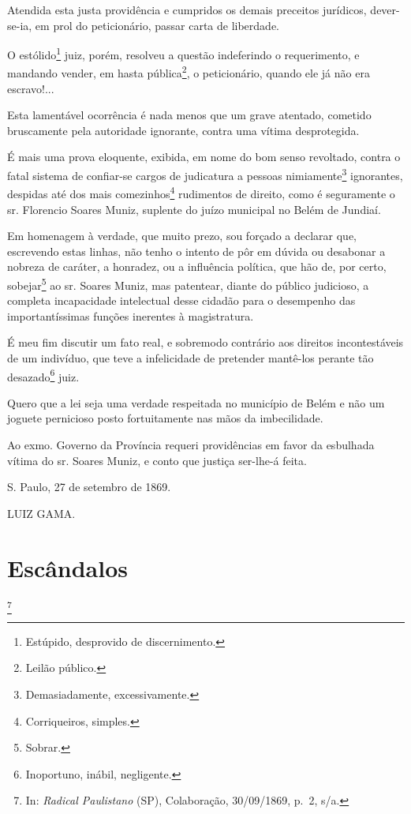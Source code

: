 Atendida esta justa providência e cumpridos os demais preceitos
jurídicos, dever-se-ia, em prol do peticionário, passar carta de
liberdade.

O estólido\footnote{Estúpido, desprovido de discernimento.} juiz,
porém, resolveu a questão indeferindo o requerimento, e mandando vender,
em hasta pública\footnote{Leilão público.}, o peticionário, quando ele
já não era escravo!...

Esta lamentável ocorrência é nada menos que um grave atentado, cometido
bruscamente pela autoridade ignorante, contra uma vítima desprotegida.

É mais uma prova eloquente, exibida, em nome do bom senso revoltado,
contra o fatal sistema de confiar-se cargos de judicatura a pessoas
nimiamente\footnote{Demasiadamente, excessivamente.} ignorantes,
despidas até dos mais comezinhos\footnote{Corriqueiros, simples.}
rudimentos de direito, como é seguramente o sr. Florencio Soares Muniz,
suplente do juízo municipal no Belém de Jundiaí.

Em homenagem à verdade, que muito prezo, sou forçado a declarar que,
escrevendo estas linhas, não tenho o intento de pôr em dúvida ou
desabonar a nobreza de caráter, a honradez, ou a influência política,
que hão de, por certo, sobejar\footnote{Sobrar.} ao sr. Soares Muniz,
mas patentear, diante do público judicioso, a completa incapacidade
intelectual desse cidadão para o desempenho das importantíssimas funções
inerentes à magistratura.

É meu fim discutir um fato real, e sobremodo contrário aos direitos
incontestáveis de um indivíduo, que teve a infelicidade de pretender
mantê-los perante tão desazado\footnote{Inoportuno, inábil,
  negligente.} juiz.

Quero que a lei seja uma verdade respeitada no município de Belém e não
um joguete pernicioso posto fortuitamente nas mãos da imbecilidade.

Ao exmo. Governo da Província requeri providências em favor da esbulhada
vítima do sr. Soares Muniz, e conto que justiça ser-lhe-á feita.

S. Paulo, 27 de setembro de 1869.

LUIZ GAMA.

\chapter{Escândalos}\footnote{In: \emph{Radical Paulistano} (SP),
  Colaboração, 30/09/1869, p.~2, s/a.}


